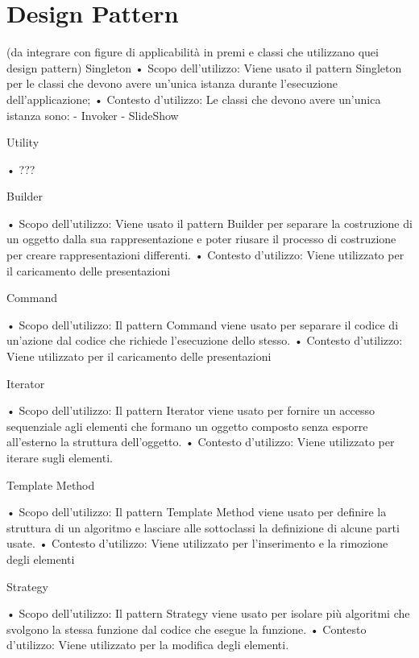 \section{Design Pattern}
(da integrare con figure di applicabilità in premi e classi che utilizzano quei design pattern)
Singleton
•	Scopo dell’utilizzo: Viene usato il pattern Singleton per le classi che devono avere un'unica istanza durante l'esecuzione dell'applicazione;
•	Contesto d’utilizzo: Le classi che devono avere un’unica istanza sono:
-	Invoker
-	SlideShow

Utility

•	???

Builder

•	Scopo dell’utilizzo: Viene usato il pattern Builder per separare la costruzione di un oggetto dalla sua rappresentazione e poter riusare il processo di costruzione per creare rappresentazioni differenti.
•	Contesto d’utilizzo: Viene utilizzato per il caricamento delle presentazioni


Command

•	Scopo dell’utilizzo: Il pattern Command viene usato per separare il codice di un’azione dal codice che richiede l’esecuzione dello stesso.
•	Contesto d’utilizzo: Viene utilizzato per il caricamento delle presentazioni

Iterator

•	Scopo dell’utilizzo: Il pattern Iterator viene usato per fornire un accesso sequenziale agli elementi che formano un oggetto composto senza esporre all’esterno la struttura dell’oggetto.
•	Contesto d’utilizzo: Viene utilizzato per iterare sugli elementi.

Template Method

•	Scopo dell’utilizzo: Il pattern Template Method viene usato per definire la struttura di un algoritmo e lasciare alle sottoclassi la definizione di alcune parti usate.
•	Contesto d’utilizzo: Viene utilizzato per l’inserimento e la rimozione degli elementi

Strategy

•	Scopo dell’utilizzo: Il pattern Strategy viene usato per isolare più algoritmi che svolgono la stessa funzione dal codice che esegue la funzione.
•	Contesto d’utilizzo: Viene utilizzato per la modifica degli elementi.
